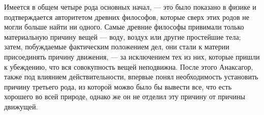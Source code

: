 \documentclass{article}
\begin{document}
Имеется в общем четыре рода основных начал, — это было показано в физике и подтверждается авторитетом древних философов, которые сверх этих родов не могли больше найти ни одного. Самые древние философы привимали только материальную причину вещей — воду, воздух или другие простейшие тела; затем, побуждаемые фактическим положением дел, они стали к материи присоединять причину движения, — за исключением тех из них, которые пришли к убеждению, что вся совокупность вещей неподвижна. После этого Анаксагор, также под влиянием действительности, впервые понял необходимость установить причину третьего рода, из которой можво было бы вывести все, что есть хорошего во всей природе, однако же он не отделил эту причину от причины движущей.
\end{document}
